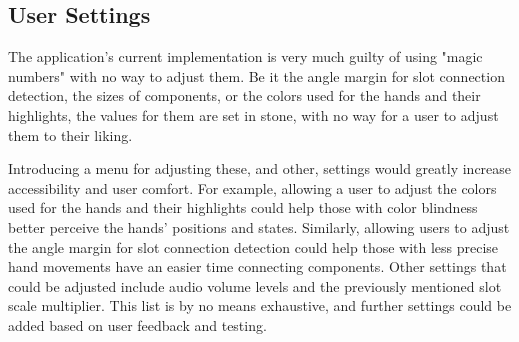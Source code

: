 \subsection{User Settings}
\label{sec:PlannedSettings}

The application's current implementation is very much guilty of using "magic numbers" \cite{martinCleanCodeHandbook2009} with no way to adjust them.
Be it the angle margin for slot connection detection, the sizes of components, or the colors used for the hands and their highlights, the values for them are set in stone, with no way for a user to adjust them to their liking.

Introducing a menu for adjusting these, and other, settings would greatly increase accessibility and user comfort.
For example, allowing a user to adjust the colors used for the hands and their highlights could help those with color blindness better perceive the hands' positions and states.
Similarly, allowing users to adjust the angle margin for slot connection detection could help those with less precise hand movements have an easier time connecting components.
Other settings that could be adjusted include audio volume levels and the previously mentioned slot scale multiplier.
This list is by no means exhaustive, and further settings could be added based on user feedback and testing.